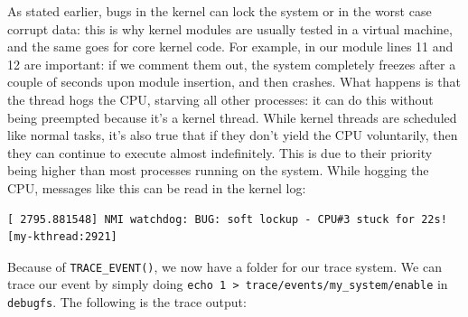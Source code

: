 As stated earlier, bugs in the kernel can lock the system or in the worst case corrupt data: this is why kernel modules are usually tested in a virtual machine, and the same goes for core kernel code. For example, in our module lines 11 and 12 are important: if we comment them out, the system completely freezes after a couple of seconds upon module insertion, and then crashes. What happens is that the thread hogs the CPU, starving all other processes: it can do this without being preempted because it's a kernel thread. While kernel threads are scheduled like normal tasks, it's also true that if they don't yield the CPU voluntarily, then they can continue to execute almost indefinitely. This is due to their priority being higher than most processes running on the system.
While hogging the CPU, messages like this can be read in the kernel log:
\begin{Verbatim}
[ 2795.881548] NMI watchdog: BUG: soft lockup - CPU#3 stuck for 22s! [my-kthread:2921]    
\end{Verbatim}
Because of \verb|TRACE_EVENT()|, we now have a folder for our trace system. We can trace our event by simply doing \verb|echo 1 > trace/events/my_system/enable| in \verb|debugfs|. The following is the trace output:
